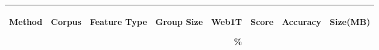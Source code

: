 \begin{table}[htbp!]
	\begin{center}
		\begin{tabular}{ | r | r | r | r | r | r | r | r | }
			\hline
			\begin{sideways}Method\end{sideways} & \begin{sideways}Corpus\end{sideways} & \begin{sideways}Feature Type\end{sideways} & \begin{sideways}Group Size\end{sideways} & \begin{sideways}Web1T\end{sideways} \% & \begin{sideways}Score\end{sideways} & \begin{sideways}Accuracy\end{sideways} & \begin{sideways}Size(MB)\end{sideways}\\ \hline 
			

\end{tabular}
\end{center}
\end{table}
